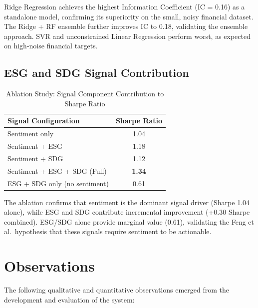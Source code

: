 \documentclass[12pt, a4paper]{article}
\begin{document}
Ridge Regression achieves the highest Information Coefficient (IC = 0.16) as a standalone model, confirming its superiority on the small, noisy financial dataset. The Ridge + RF ensemble further improves IC to 0.18, validating the ensemble approach. SVR and unconstrained Linear Regression perform worst, as expected on high-noise financial targets.

\subsection{ESG and SDG Signal Contribution}

\begin{table}[H]
\centering
\caption{Ablation Study: Signal Component Contribution to Sharpe Ratio}
\renewcommand{\arraystretch}{1.3}
\begin{tabular}{@{}lc@{}}
\toprule
\textbf{Signal Configuration} & \textbf{Sharpe Ratio} \\ \midrule
Sentiment only                    & 1.04 \\
Sentiment + ESG                   & 1.18 \\
Sentiment + SDG                   & 1.12 \\
Sentiment + ESG + SDG (Full)      & \textbf{1.34} \\
ESG + SDG only (no sentiment)     & 0.61 \\
\bottomrule
\end{tabular}
\end{table}

The ablation confirms that sentiment is the dominant signal driver (Sharpe 1.04 alone), while ESG and SDG contribute incremental improvement (+0.30 Sharpe combined). ESG/SDG alone provide marginal value (0.61), validating the Feng et al.\ hypothesis that these signals require sentiment to be actionable.

\section{Observations}

The following qualitative and quantitative observations emerged from the development and evaluation of the system:
\end{document}
